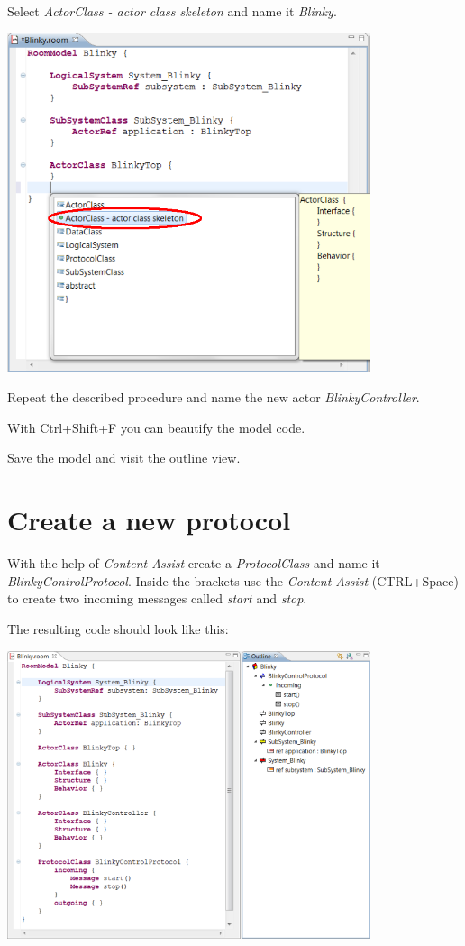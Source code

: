 Select \textit{ActorClass - actor class skeleton} and name it \textit{Blinky}.

\includegraphics[width=0.8\textwidth]{images/020-Blinky01.png}

Repeat the described procedure and name the new actor \textit{BlinkyController}.

With Ctrl+Shift+F you can beautify the model code. 

Save the model and visit the outline view.

\section{Create a new protocol}

With the help of \textit{Content Assist} create a \textit{ProtocolClass} and name it 
\textit{BlinkyControlProtocol}.
Inside the brackets use the \textit{Content Assist} (CTRL+Space) to create two incoming messages called 
\textit{start} and \textit{stop}.

The resulting code should look like this:

\includegraphics[width=0.8\textwidth]{images/020-Blinky03.png}

